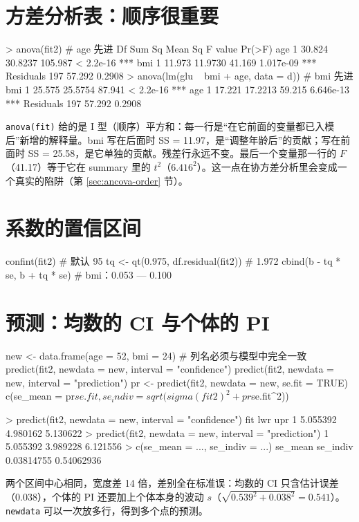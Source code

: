 \section{方差分析表：顺序很重要}
\begin{routput}
> anova(fit2)                          # age 先进
           Df Sum Sq Mean Sq F value    Pr(>F)
age         1 30.824 30.8237 105.987 < 2.2e-16 ***
bmi         1 11.973 11.9730  41.169 1.017e-09 ***
Residuals 197 57.292  0.2908
> anova(lm(glu ~ bmi + age, data = d)) # bmi 先进
bmi         1 25.575 25.5754  87.941 < 2.2e-16 ***
age         1 17.221 17.2213  59.215 6.646e-13 ***
Residuals 197 57.292  0.2908
\end{routput}
\Verb|anova(fit)| 给的是 I 型（顺序）平方和：每一行是“在它前面的变量都已入模后”新增的解释量。bmi 写在后面时 SS = 11.97，是“调整年龄后”的贡献；写在前面时 SS = 25.58，是它单独的贡献。残差行永远不变。最后一个变量那一行的 $F$（41.17）等于它在 summary 里的 $t^2$（$6.416^2$）。这一点在协方差分析里会变成一个真实的陷阱（第 \ref{sec:ancova-order} 节）。

\section{系数的置信区间}
\begin{rcode}
confint(fit2)                        # 默认 95%
tq <- qt(0.975, df.residual(fit2))   # 1.972
cbind(b - tq * se, b + tq * se)      # bmi：0.053 — 0.100
\end{rcode}

\section{预测：均数的 CI 与个体的 PI}
\begin{rcode}[R · predict]
new <- data.frame(age = 52, bmi = 24)     # 列名必须与模型中完全一致
predict(fit2, newdata = new, interval = "confidence")
predict(fit2, newdata = new, interval = "prediction")
pr <- predict(fit2, newdata = new, se.fit = TRUE)
c(se_mean = pr$se.fit, se_indiv = sqrt(sigma(fit2)^2 + pr$se.fit^2))
\end{rcode}
\begin{routput}
> predict(fit2, newdata = new, interval = "confidence")
       fit      lwr      upr
1 5.055392 4.980162 5.130622
> predict(fit2, newdata = new, interval = "prediction")
1 5.055392 3.989228 6.121556
> c(se_mean = ..., se_indiv = ...)
   se_mean   se_indiv
0.03814755 0.54062936
\end{routput}
两个区间中心相同，宽度差 14 倍，差别全在标准误：均数的 CI 只含估计误差（0.038），个体的 PI 还要加上个体本身的波动 $s$（$\sqrt{0.539^2+0.038^2}=0.541$）。\Verb|newdata| 可以一次放多行，得到多个点的预测。


